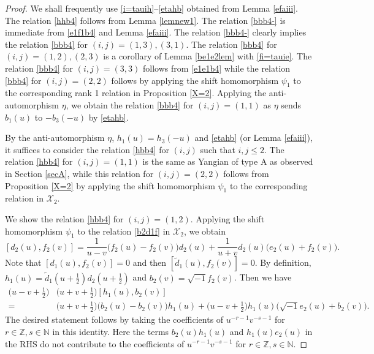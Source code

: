\documentclass[11pt,reqno]{amsart}
\numberwithin{equation}{section}
\theoremstyle{definition}
\theoremstyle{remark}
\newcommand{\bN}{\mathbb{N}}
\newcommand{\tl}{\tilde}
\newcommand{\lle}{\leqslant}
\newcommand{\scrX}{{\mathscr{X}}}
\def \Z{\mathbb{Z}}
\begin{document}
\begin{proof}
We shall frequently use \eqref{i=tauih}--\eqref{etahb} obtained from Lemma \ref{efaiii}. 
The relation \eqref{hhb4} follows from Lemma \ref{lemnew1}. The relation \eqref{bbb4-} is immediate from \eqref{e1f1b4} and Lemma \ref{efaiii}. The relation \eqref{bbb4-} clearly implies the relation \eqref{bbb4} for $(i,j)=(1,3),(3,1)$. The relation \eqref{bbb4} for $(i,j)=(1,2),(2,3)$ is a corollary of Lemma \ref{be1e2lem} with \eqref{fi=tauie}. The relation \eqref{bbb4} for $(i,j)=(3,3)$ follows from \eqref{e1e1b4} while the relation \eqref{bbb4} for $(i,j)=(2,2)$ follows by applying the shift homomorphism $\psi_1$ to the corresponding rank 1 relation in Proposition \ref{X=2}. Applying the anti-automorphism $\eta$, we obtain the relation \eqref{bbb4} for $(i,j)=(1,1)$ as $\eta$ sends $b_1(u)$ to $-b_3(-u)$ by \eqref{etahb}.

By the anti-automorphism $\eta$, $h_1(u)=h_3(-u)$ and \eqref{etahb} (or Lemma \ref{efaiii}), it suffices to consider the relation \eqref{hbb4} for $(i,j)$ such that $i,j\lle 2$. The relation \eqref{hbb4} for $(i,j)=(1,1)$ is the same as  Yangian of type A as observed in Section \ref{secA}, while this relation for $(i,j)=(2,2)$ follows from Proposition \ref{X=2} by applying the shift homomorphism $\psi_1$ to the corresponding relation in $\scrX_2$. 
 
We show the relation \eqref{hbb4} for $(i,j)=(1,2)$. Applying the shift homomorphism $\psi_1$ to the relation \eqref{b2d1f} in $\scrX_2$, we obtain
\[
[d_2(u),f_2(v)]=\frac{1}{u-v}\big(f_2(u)-f_2(v)\big)d_2(u)+\frac{1}{u+v}d_2(u)\big(e_2(u)+f_2(v)\big).
\]
Note that $[d_1(u),f_2(v)]=0$ and then $[\tl{d}_1(u),f_2(v)]=0$. By definition, $h_1(u)=\tl{d}_1(u+\frac{1}{2}) d_2(u+\frac{1}{2})$ and $b_2(v)=\sqrt{-1}f_2(v)$. Then we have
\begin{align*}
\big(u-v+\tfrac{1}{2}\big)&\big(u+v+\tfrac{1}{2}\big) [h_1(u),b_2(v)]\\
=\, &\big(u+v+\tfrac{1}{2}\big) \big(b_2(u)-b_2(v)\big)h_1(u) + \big(u-v+\tfrac{1}{2}\big)h_1(u)\big(\sqrt{-1}e_2(u)+b_2(v)\big).%
\end{align*}
The desired statement follows by taking the coefficients of $u^{-r-1}v^{-s-1}$ for $r\in\Z,s\in \bN$ in this identity. Here the terms $b_2(u)h_1(u)$ and $h_1(u)e_2(u)$ in the RHS do not contribute to the coefficients of $u^{-r-1}v^{-s-1}$ for $r\in\Z,s\in\bN$. 


\end{proof}
\end{document}
